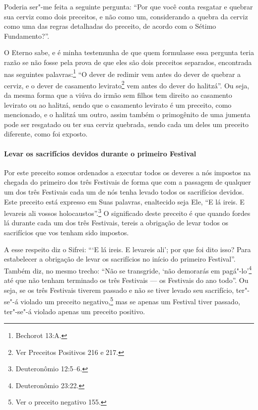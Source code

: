 \begin{multicols}{2}
Poderia ser"-me feita a seguinte pergunta: ``Por que você conta resgatar
e quebrar sua cerviz como dois preceitos, e não como um, considerando a
quebra da cerviz como uma das regras detalhadas do preceito, de acordo
com o Sétimo Fundamento?''.

O Eterno sabe, e é minha testemunha de que quem formulasse essa pergunta
teria razão se não fosse pela prova de que eles são dois preceitos
separados, encontrada nas seguintes palavras:\footnote{Bechorot 13:A.} ``O
dever de redimir vem antes do dever de quebrar a cerviz, e o dever de
casamento levirato\starr\footnote{Ver Preceitos Positivos 216 e 217.} vem antes do dever do
halitzá\starr''. Ou seja, da mesma forma que a viúva
do irmão sem filhos tem direito ao casamento levirato\starr{} ou ao halitzá\starr,
sendo que o casamento levirato\starr{} é um preceito, como mencionado, e o
halitzá\starr{} um outro, assim também o primogênito de uma jumenta pode ser
resgatado ou ter sua cerviz quebrada, sendo cada um deles um preceito
diferente, como foi exposto.

\paragraph{Levar os sacrifícios devidos durante o primeiro Festival}

Por este preceito somos ordenados a executar todos os deveres a nós
impostos na chegada do primeiro dos três Festivais de forma que com a
passagem de qualquer um dos três Festivais cada um de nós tenha levado
todos os
sacrifícios devidos. Este preceito está expresso em Suas palavras,
enaltecido seja
Ele, ``E lá ireis. E levareis ali vossos holocaustos''.\footnote{Deuteronômio
12:5--6.} O significado deste preceito é que quando fordes lá durante
cada um dos três Festivais, tereis a obrigação de levar todos os
sacrifícios que vos tenham sido impostos.

A esse respeito diz o Sifrei\starr: ```E lá ireis. E levareis ali'; por que
foi dito isso? Para estabelecer a obrigação de levar os sacrifícios no
início do primeiro Festival''. Também diz, no mesmo trecho: ``Não se
transgride, `não demorarás em pagá"-lo'\footnote{Deuteronômio 23:22.} até que não
tenham terminado os três Festivais --- os Festivais do ano todo''. Ou seja, se os três
Festivais tiverem passado e não se tiver levado seu sacrifício, ter"-se"-á violado um
preceito negativo,\footnote{Ver o preceito negativo 155.} mas se apenas um Festival tiver passado,
ter"-se"-á violado apenas um preceito positivo.


\end{multicols}
